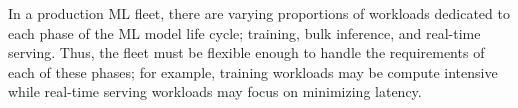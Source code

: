 In a production ML fleet, there are varying proportions of workloads dedicated to each phase of the ML model life cycle; training, bulk inference, and real-time serving. Thus, the fleet must be flexible enough to handle the requirements of each of these phases; for example, training workloads may be compute intensive while real-time serving workloads may focus on minimizing latency.
















